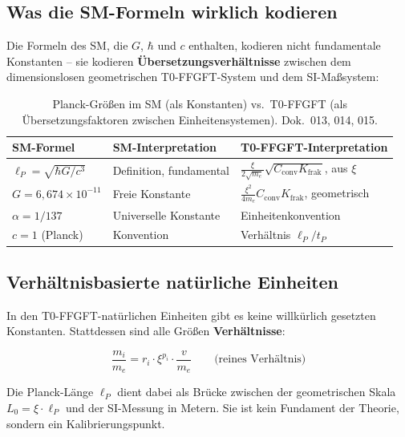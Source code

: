 \subsection{Was die SM-Formeln wirklich kodieren}

Die Formeln des SM, die $G$, $\hbar$ und $c$ enthalten, kodieren
nicht fundamentale Konstanten -- sie kodieren
\textbf{Übersetzungsverhältnisse} zwischen dem dimensionslosen
geometrischen T0-FFGFT-System und dem SI-Maßsystem:

\begin{table}[htbp]
\centering\small
\begin{tabular}{lll}
\toprule
\textbf{SM-Formel} & \textbf{SM-Interpretation} & \textbf{T0-FFGFT-Interpretation} \\
\midrule
$\ell_P = \sqrt{\hbar G/c^3}$ & Definition, fundamental & $\frac{\xi}{2\sqrt{m_e}}\sqrt{C_{\text{conv}}K_{\text{frak}}}$, aus $\xi$ \\
$G = 6{,}674 \times 10^{-11}$ & Freie Konstante          & $\frac{\xi^2}{4m_e}C_{\text{conv}}K_{\text{frak}}$, geometrisch \\
$\alpha = 1/137$ & Universelle Konstante    & Einheitenkonvention \\
$c = 1$ (Planck) & Konvention               & Verhältnis $\ell_P/t_P$ \\
\bottomrule
\end{tabular}
\caption{Planck-Größen im SM (als Konstanten) vs.\ T0-FFGFT (als
Übersetzungsfaktoren zwischen Einheitensystemen). Dok.~013, 014, 015.}
\label{tab:planck_translation}
\end{table}

\subsection{Verhältnisbasierte natürliche Einheiten}

In den T0-FFGFT-natürlichen Einheiten gibt es keine willkürlich
gesetzten Konstanten. Stattdessen sind alle Größen
\textbf{Verhältnisse}:

\begin{equation}
    \frac{m_i}{m_e} = r_i \cdot \xi^{p_i} \cdot \frac{v}{m_e}
    \qquad \text{(reines Verhältnis)}
\end{equation}

Die Planck-Länge $\ell_P$ dient dabei als Brücke zwischen der
geometrischen Skala $L_0 = \xi \cdot \ell_P$ und der SI-Messung
in Metern. Sie ist kein Fundament der Theorie, sondern ein
Kalibrierungspunkt.

